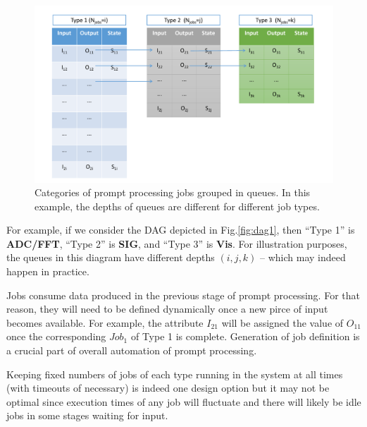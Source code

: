 \documentclass[pdftex,12pt,letter]{article}
\begin{document}
\begin{figure}[tbh]
  \centering
  \includegraphics[width=1.1\textwidth]{figures/prompt_queues_1.pdf}
  \caption{Categories of prompt processing jobs grouped in queues. In this example, the depths of queues are different for different job types.}
  \label{fig:queues1}
\end{figure}

For example, if we consider the DAG depicted in Fig.\ref{fig:dag1}, then ``Type 1''
is \textbf{ADC/FFT}, ``Type 2'' is \textbf{SIG}, and ``Type 3'' is \textbf{Vis}. For illustration purposes,
the queues in this diagram have different depths $(i,j,k)$  -- which may indeed happen in practice.

Jobs consume data produced in the previous stage of prompt processing. For that reason, they
will need to be defined dynamically once a new pirce of input becomes available. For example,
the attribute $I_{21}$ will be assigned the value of $O_{11}$ once the corresponding $Job_1$ of Type 1
is complete. Generation of job definition is a crucial part of overall automation of prompt processing.

Keeping fixed numbers of jobs of each type running in the system at all times (with timeouts of necessary)
is indeed one design option but it may not be optimal since execution times of any job will fluctuate and there
will likely be idle jobs in some stages waiting for input.
\end{document}
